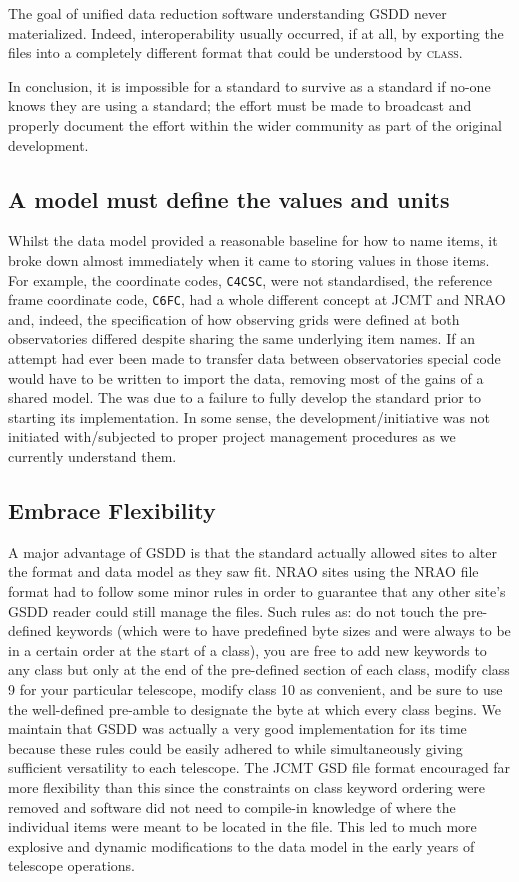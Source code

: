 \documentclass[final,authoryear,5p,times,twocolumn]{elsarticle}
\begin{document}
The goal of unified data reduction software understanding GSDD never
materialized. Indeed, interoperability usually occurred, if at all, by exporting
the files into a completely different format that could be understood
by \textsc{class}.

In conclusion, it is impossible for a standard to survive as a standard
if no-one knows they are using a standard; the effort must be made
to broadcast and properly document the effort within the wider
community as part of the original development.

\subsection{A model must define the values and units}

Whilst the data model provided a reasonable baseline for how to name
items, it broke down almost immediately when it came to storing values
in those items. For example, the coordinate codes, \texttt{C4CSC},
were not standardised, the reference frame coordinate code,
\texttt{C6FC}, had a whole different concept at JCMT and NRAO and,
indeed, the specification of how observing grids were defined at both
observatories differed despite sharing the same underlying item
names. If an attempt had ever been made to transfer data between
observatories special code would have to be written to import the
data, removing most of the gains of a shared model.
The was due to a failure to fully develop the standard prior to
starting its implementation. In some sense, the development/initiative
was not initiated with/subjected to proper project management
procedures as we currently understand them.

\subsection{Embrace Flexibility}

A major advantage of GSDD is that the standard actually allowed sites
to alter the format and data model as they saw fit.
NRAO sites using the NRAO file format had to follow some minor rules in order to
guarantee that any other site's GSDD reader could still manage the
files.  Such rules as: do not touch the pre-defined keywords (which
were to have predefined byte sizes and were always to be in a certain
order at the start of a class), you are free to add new keywords to
any class but only at the end of the pre-defined section of each
class, modify class 9 for your particular telescope, modify class 10
as convenient, and be sure to use the well-defined pre-amble to
designate the byte at which every class begins.  We maintain that GSDD
was actually a very good implementation for its time because these
rules could be easily adhered to while simultaneously giving
sufficient versatility to each telescope. The JCMT GSD file format
encouraged far more flexibility than this since the constraints on
class keyword ordering were removed and software did not need to
compile-in knowledge of where the individual items were meant to be
located in the file. This led to much more explosive and
dynamic modifications to the data model in the early years of
telescope operations.
\end{document}
